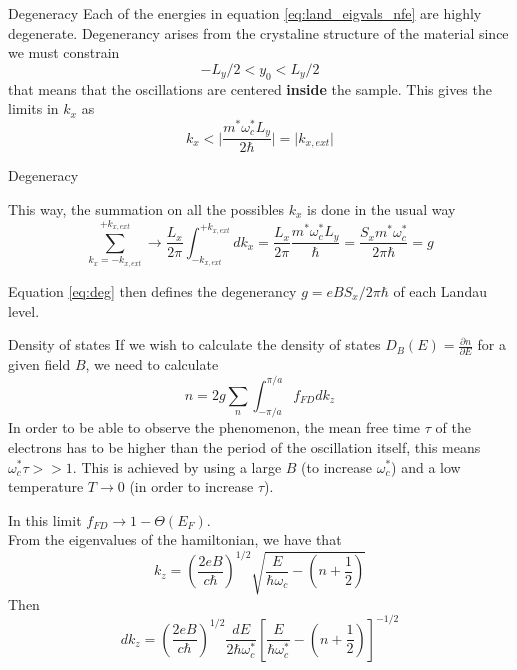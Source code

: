 \documentclass{beamer}
\begin{document}
\begin{frame}{Degeneracy}
    Each of the energies in equation \ref{eq:land_eigvals_nfe} are highly degenerate. Degenerancy arises from the crystaline structure of the material since we must constrain 
    \begin{equation}
        -L_y/2<y_0<L_y/2
    \end{equation}
    that means that the oscillations are centered \textbf{inside} the sample. This gives the limits in $k_x$ as 
    \begin{equation}
        k_x<\lvert\frac{m^*\omega_c^*L_y}{2\hbar}\rvert=\lvert k_{x,ext}\rvert
    \end{equation}
    
\end{frame}
\begin{frame}{Degeneracy}
  
 This way, the summation on all the possibles $k_x$ is done in the usual way
 \begin{equation}
     \sum_{k_x=-k_{x,ext}}^{+k_{x,ext}} \rightarrow \frac{L_x}{2\pi}\int_{-k_{x,ext}}^{+k_{x,ext}}dk_x=\frac{L_x}{2\pi}\frac{m^*\omega_c^*L_y}{\hbar}=\frac{S_xm^*\omega_c^*}{2\pi\hbar}=g
     \label{eq:deg}
 \end{equation}

 Equation \ref{eq:deg} then defines the degenerancy $g=eBS_x/2\pi\hbar$ of each Landau level.
\end{frame}
\begin{frame}{Density of states}
  If we wish to calculate the density of states $D_B(E)=\frac{\partial n}{\partial E}$ for a given field $B$, we need to calculate 
  \begin{equation}
      n=2g\sum_n\int_{-\pi/a}^{\pi/a}f_{FD}dk_z
  \end{equation}
  In order to be able to observe the phenomenon, the mean free time $\tau$ of the electrons has to be higher than the period of the oscillation itself, this means $\omega_c^*\tau>>1$. This is achieved by using a large $B$ (to increase $\omega_c^*$) and a low temperature $T\rightarrow0$ (in order to increase $\tau$).
\end{frame}
\begin{frame}
  In this limit $f_{FD}\rightarrow 1-\Theta(E_F)$.\\
  From the eigenvalues of the hamiltonian, we have that 
  \begin{equation}
      k_z=\left(\frac{2eB}{c\hbar}\right)^{1/2}\sqrt{\frac{E}{\hbar\omega_c}-\left(n+\frac{1}{2}\right)}
  \end{equation}
  Then
  \begin{equation}
      dk_z=\left(\frac{2eB}{c\hbar}\right)^{1/2}\frac{dE}{2\hbar\omega_c^*}\left[\frac{E}{\hbar\omega_c^*}-\left(n+\frac{1}{2}\right)\right]^{-1/2}
  \end{equation} 
     
\end{frame}
\end{document}
